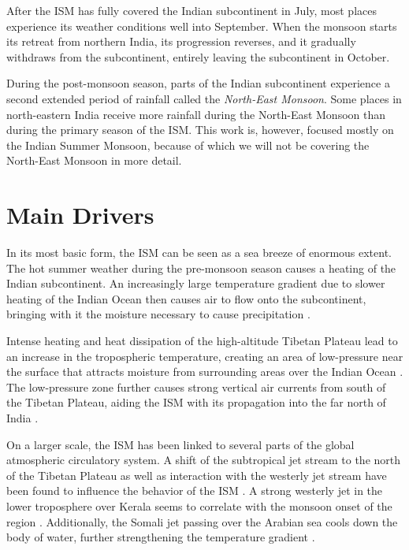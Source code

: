 After the ISM has fully covered the Indian subcontinent in July, most places experience its weather conditions well into September. When the monsoon starts its retreat from northern India, its progression reverses, and it gradually withdraws from the subcontinent, entirely leaving the subcontinent in October.

During the post-monsoon season, parts of the Indian subcontinent experience a second extended period of rainfall called the \textit{North-East Monsoon}. Some places in north-eastern India receive more rainfall during the North-East Monsoon than during the primary season of the ISM. This work is, however, focused mostly on the Indian Summer Monsoon, because of which we will not be covering the North-East Monsoon in more detail.


\section{Main Drivers}
\label{st:ism_factors}
In its most basic form, the ISM can be seen as a sea breeze of enormous extent. The hot summer weather during the pre-monsoon season causes a heating of the Indian subcontinent. An increasingly large temperature gradient due to slower heating of the Indian Ocean then causes air to flow onto the subcontinent, bringing with it the moisture necessary to cause precipitation \citep{Willetts.2017}.

Intense heating and heat dissipation of the high-altitude Tibetan Plateau lead to an increase in the tropospheric temperature, creating an area of low-pressure near the surface that attracts moisture from surrounding areas over the Indian Ocean \citep{Stolbova.2015}. The low-pressure zone further causes strong vertical air currents from south of the Tibetan Plateau, aiding the ISM with its propagation into the far north of India \citep{Pradhan.2017}.

On a larger scale, the ISM has been linked to several parts of the global atmospheric circulatory system. A shift of the subtropical jet stream to the north of the Tibetan Plateau as well as interaction with the westerly jet stream have been found to influence the behavior of the ISM \citep{Ordonez.2016, Stolbova.2015}. A strong westerly jet in the lower troposphere over Kerala seems to correlate with the monsoon onset of the region \citep{Ordonez.2016}. Additionally, the Somali jet passing over the Arabian sea cools down the body of water, further strengthening the temperature gradient \citep{Stolbova.2015}.

